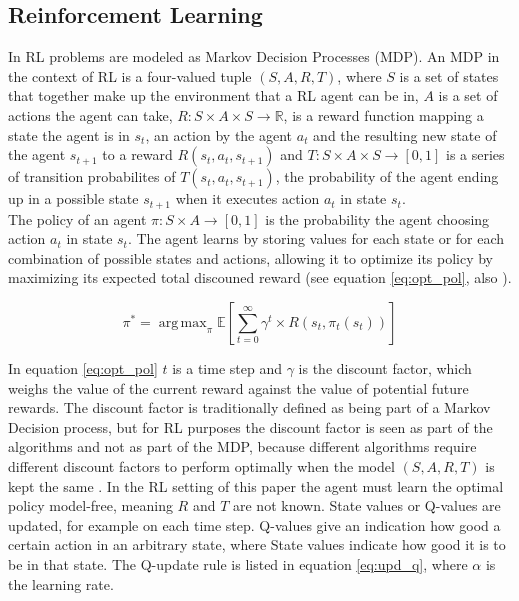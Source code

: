 

\subsection{Reinforcement Learning}

In RL problems are modeled as Markov Decision Processes (MDP). An MDP in the context of RL
is a four-valued tuple $(S,A,R,T)$, where $S$ is a set of states that together make up the environment that a RL agent can be in,
 $A$ is a set of actions the agent can take, $R: S \times A \times S \rightarrow \mathbb{R}$, is a reward function mapping a state the agent is in $s_t$,
 an action by the agent $a_t$ and the resulting new state of the agent $s_{t+1}$ to a reward $R(s_t,a_t,s_{t+1})$
 and $T: S \times A \times S \rightarrow [0,1]$ is a series of transition probabilites of $T(s_t,a_t,s_{t+1})$, the probability of the agent
 ending up in a possible state $s_{t+1}$ when it executes action $a_t$ in state $s_t$. \\
 The policy of an agent $\pi: S \times A \rightarrow [0,1]$ is the probability the agent choosing action $a_t$ in state $s_t$. The agent learns by storing values for each
 state or for each combination of possible states and actions, allowing it to optimize its policy by maximizing its expected total discouned reward
 (see equation \ref{eq:opt_pol}, also \cite{zimmer2016neural}).

\begin{equation}
\label{eq:opt_pol}
\pi^* = \operatorname{arg\,max}_{\pi} \mathbb{E}\left [ \sum_{t = 0}^{\infty}\gamma^{t} \times R(s_t,\pi_t(s_t))\right ]
\end{equation}

In equation \eqref{eq:opt_pol} $t$ is a time step and $\gamma$ is the discount factor, which weighs the value of the current reward against the value of potential future rewards.
The discount factor is traditionally defined as being part of a Markov Decision process, but for RL purposes the discount factor is seen as part
of the algorithms and not as part of the MDP, because different algorithms require different discount factors to perform optimally when the model
$(S,A,R,T)$ is kept the same \cite{van2007reinforcement}. In the RL setting of this paper the agent must learn the optimal policy model-free, meaning $R$ and $T$ are not known.
State values or Q-values are updated, for example on each time step. Q-values give an indication how good a certain action in an arbitrary state, where State values indicate how good it is to be in that state. The Q-update rule is listed in equation \ref{eq:upd_q}, where $\alpha$ is the learning rate.

